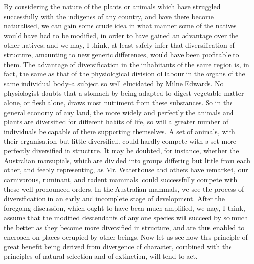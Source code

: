 By considering the nature of the plants or animals which have struggled successfully with the indigenes of any country, and have there become naturalised, we can gain some crude idea in what manner some of the natives would have had to be modified, in order to have gained an advantage over the other natives; and we may, I think, at least safely infer that diversification of structure, amounting to new generic differences, would have been profitable to them.
The advantage of diversification in the inhabitants of the same region is, in fact, the same as that of the physiological division of labour in the organs of the same individual body--a subject so well elucidated by Milne Edwards. No physiologist doubts that a stomach by being adapted to digest vegetable matter alone, or flesh alone, draws most nutriment from these substances. So in the general economy of any land, the more widely and perfectly the animals and plants are diversified for different habits of life, so will a greater number of individuals be capable of there supporting themselves. A set of animals, with their organisation but little diversified, could hardly compete with a set more perfectly diversified in structure. It may be doubted, for instance, whether the Australian marsupials, which are divided into groups differing but little from each other, and feebly representing, as Mr. Waterhouse and others have remarked, our carnivorous, ruminant, and rodent mammals, could successfully compete with these well-pronounced orders. In the Australian mammals, we see the process of diversification in an early and incomplete stage of development. After the foregoing discussion, which ought to have been much amplified, we may, I think, assume that the modified descendants of any one species will succeed by so much the better as they become more diversified in structure, and are thus enabled to encroach on places occupied by other beings. Now let us see how this principle of great benefit being derived from divergence of character, combined with the principles of natural selection and of extinction, will tend to act.
